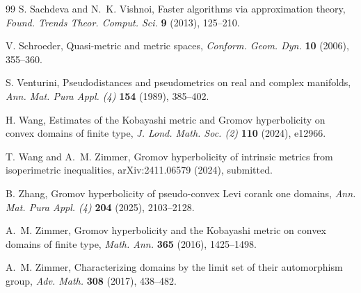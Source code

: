 \documentclass[11pt]{article}
\theoremstyle{definition}
\begin{document}
\begin{thebibliography}{99}
	S. Sachdeva and N.~K. Vishnoi,
	Faster algorithms via approximation theory,
	\emph{Found. Trends Theor. Comput. Sci.} \textbf{9} (2013), 125--210.
	
	V. Schroeder,
	Quasi-metric and metric spaces,
	\emph{Conform. Geom. Dyn.} \textbf{10} (2006), 355--360.
	
	S. Venturini,
	Pseudodistances and pseudometrics on real and complex manifolds,
	\emph{Ann. Mat. Pura Appl. (4)} \textbf{154} (1989), 385--402.
	
	H. Wang,
	Estimates of the Kobayashi metric and Gromov hyperbolicity on convex
	domains of finite type,
	\emph{J. Lond. Math. Soc. (2)} \textbf{110} (2024), e12966.
	
	T. Wang and A.~M. Zimmer,
	Gromov hyperbolicity of intrinsic metrics from isoperimetric inequalities,
	arXiv:2411.06579 (2024), submitted.
	
	B. Zhang,
	Gromov hyperbolicity of pseudo-convex Levi corank one domains,
	\emph{Ann. Mat. Pura Appl. (4)} \textbf{204} (2025), 2103--2128.
	
	A.~M. Zimmer,
	Gromov hyperbolicity and the Kobayashi metric on convex domains of
	finite type,
	\emph{Math. Ann.} \textbf{365} (2016), 1425--1498.
	
	A.~M. Zimmer,
	Characterizing domains by the limit set of their automorphism group,
	\emph{Adv. Math.} \textbf{308} (2017), 438--482.
	
\end{thebibliography}
\end{document}
